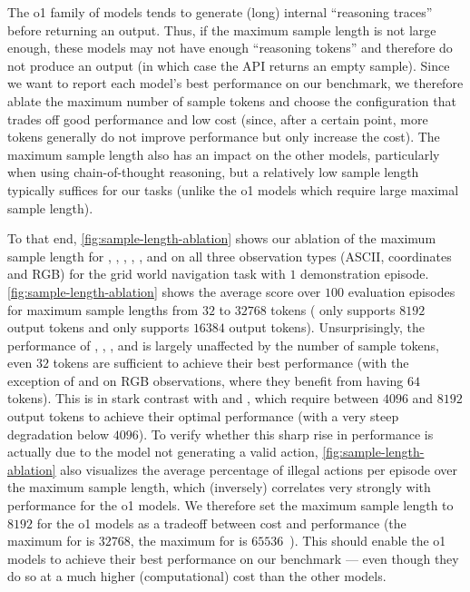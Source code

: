 The o1 family of models tends to generate (long) internal ``reasoning traces'' before returning an output.
Thus, if the maximum sample length is not large enough, these models may not have enough ``reasoning tokens'' and therefore do not produce an output (in which case the API returns an empty sample).
Since we want to report each model's best performance on our benchmark, we therefore ablate the maximum number of sample tokens and choose the configuration that trades off good performance and low cost (since, after a certain point, more tokens generally do not improve performance but only increase the cost).
The maximum sample length also has an impact on the other models, particularly when using chain-of-thought reasoning, but a relatively low sample length typically suffices for our tasks (unlike the o1 models which require large maximal sample length).

To that end, \cref{fig:sample-length-ablation} shows our ablation of the maximum sample length for \claude{}, \gpt{}, \mini{}, \preview{}, \flash{}, and \pro{} on all three observation types (ASCII, coordinates and RGB) for the grid world navigation task with $1$ demonstration episode.
\cref{fig:sample-length-ablation} shows the average score over $100$ evaluation episodes for maximum sample lengths from $32$ to $32768$ tokens (\claude{} only supports $8192$ output tokens and \gpt{} only supports $16384$ output tokens).
Unsurprisingly, the performance of \claude{}, \gpt{}, \flash{}, and \pro{} is largely unaffected by the number of sample tokens, \ie even $32$ tokens are sufficient to achieve their best performance (with the exception of \claude{} and \gpt{} on RGB observations, where they benefit from having $64$ tokens).
This is in stark contrast with \mini{} and \preview{}, which require between $4096$ and $8192$ output tokens to achieve their optimal performance (with a very steep degradation below $4096$).
To verify whether this sharp rise in performance is actually due to the model not generating a valid action, \cref{fig:sample-length-ablation} also visualizes the average percentage of illegal actions per episode over the maximum sample length, which (inversely) correlates very strongly with performance for the o1 models.
We therefore set the maximum sample length to $8192$ for the o1 models as a tradeoff between cost and performance (the maximum for \preview{} is $32768$, the maximum for \mini{} is $65536$~\citep{openai2024reasoning}).
This should enable the o1 models to achieve their best performance on our benchmark --- even though they do so at a much higher (computational) cost than the other models.


